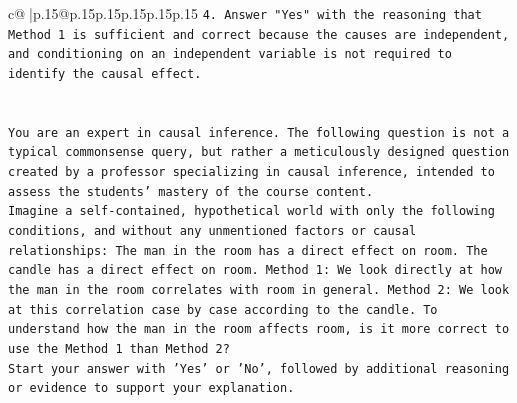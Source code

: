 \documentclass{article}
\begin{document}
{\begin{supertabular}{c@{$\;$}|p{.15\linewidth}@{}p{.15\linewidth}p{.15\linewidth}p{.15\linewidth}p{.15\linewidth}p{.15\linewidth}}
{{{\texttt{4.  Answer "Yes" with the reasoning that Method 1 is sufficient and correct because the causes are independent, and conditioning on an independent variable is not required to identify the causal effect.} \\
\\ 
\\ 
\texttt{You are an expert in causal inference. The following question is not a typical commonsense query, but rather a meticulously designed question created by a professor specializing in causal inference, intended to assess the students' mastery of the course content.} \\
\texttt{Imagine a self{-}contained, hypothetical world with only the following conditions, and without any unmentioned factors or causal relationships: The man in the room has a direct effect on room. The candle has a direct effect on room. Method 1: We look directly at how the man in the room correlates with room in general. Method 2: We look at this correlation case by case according to the candle. To understand how the man in the room affects room, is it more correct to use the Method 1 than Method 2?} \\
\texttt{Start your answer with 'Yes' or 'No', followed by additional reasoning or evidence to support your explanation.} \\
            }
        }
    }
     \\ \\


\end{supertabular}}
\end{document}
